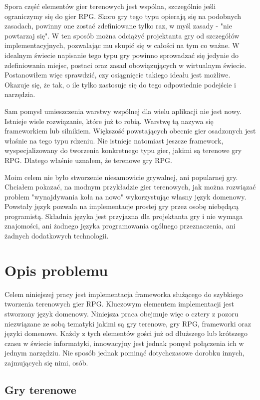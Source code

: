\documentclass	{xmgr}
\begin{document}
Spora część elementów gier terenowych jest wspólna, szczególnie jeśli ograniczymy się do gier RPG. Skoro gry tego typu opierają się na podobnych zasadach, powinny one zostać zdefiniowane tylko raz, w myśl zasady - "nie powtarzaj się". W ten sposób można odciążyć projektanta gry od szczegółów implementacyjnych, pozwalając mu skupić się w całości na tym co ważne. W idealnym świecie napisanie tego typu gry powinno sprowadzać się jedynie do zdefiniowania miejsc, postaci oraz zasad obowiązujących w wirtualnym świecie. Postanowiłem więc sprawdzić, czy osiągnięcie takiego ideału jest możliwe. Okazuje się, że tak, o ile tylko zastosuje się do tego odpowiednie podejście i narzędzia.

Sam pomysł umieszczenia warstwy wspólnej dla wielu aplikacji nie jest nowy. Istnieje wiele rozwiązanie, które już to robią. Warstwę tą nazywa się frameworkiem lub silnikiem. Większość powstających obecnie gier osadzonych jest właśnie na tego typu rdzeniu. Nie istnieje natomiast jeszcze framework, wyspecjalizowany do tworzenia konkretnego typu gier, jakimi są terenowe gry RPG. Dlatego właśnie uznałem, że terenowe gry RPG. 

Moim celem nie było stworzenie niesamowicie grywalnej, ani popularnej gry. Chciałem pokazać, na modnym przykładzie gier terenowych, jak można rozwiązać problem "wynajdywania koła na nowo" wykorzystując własny język domenowy. Powstały język pozwala na implementacje prostej gry przez osobę niebędącą programistą. Składnia języka jest przyjazna dla projektanta gry i nie wymaga znajomości, ani żadnego języka programowania ogólnego przeznaczenia, ani żadnych dodatkowych technologii.

\chapter{Opis problemu}

Celem niniejszej pracy jest implementacja frameworka służącego do szybkiego tworzenia terenowych gier RPG. Kluczowym elementem implementacji jest stworzony język domenowy. Niniejsza praca obejmuje więc o cztery z pozoru niezwiązane ze sobą tematyki jakimi są gry terenowe, gry RPG, frameworki oraz języki domenowe. Każdy z tych elementów gości już od dłuższego lub krótszego czasu w świecie informatyki, innowacyjny jest jednak pomysł połączenia ich w jednym narzędziu. Nie sposób jednak pominąć dotychczasowe dorobku innych, zajmujących się nimi, osób. 

\section{Gry terenowe}
\end{document}
